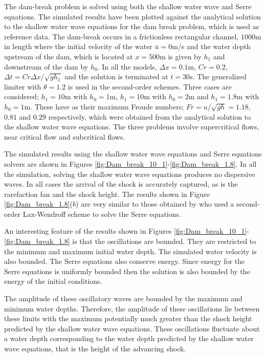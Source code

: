 \documentclass[SingleSpace,12pt]{Serre_ASCE}
\begin{document}
The dam-break problem is solved using both the shallow water wave and Serre equations. The simulated results have been plotted against the analytical solution to the shallow water wave equations for the dam break problem, which is used as reference data. The dam-break occurs in a frictionless rectangular channel, $1000$m in length where the initial velocity of the water $\bar{u} = 0$m/s and the water depth upstream of the dam, which is located at $x = 500$m is given by $h_1$ and downstream of the dam by $h_0$.  In all the models,  $\Delta x = 0.1$m, $Cr = 0.2$, $\Delta t = Cr \Delta x/\sqrt{gh_1}$ and the solution is terminated at $t = 30$s. The generalized limiter with $\theta = 1.2$ is used in the second-order schemes. Three cases are considered; $h_1 = 10$m with $h_0 = 1$m,  $h_1 = 10$m with $h_0 = 2$m and $h_1 = 1.8$m with $h_0 = 1$m. These have as their maximum Froude numbers; $Fr = u/\sqrt{gh} = 1.18$, $0.81$ and $0.29$ respectively, which were obtained from the analytical solution to the shallow water wave equations. The three problems involve supercritical flows, near critical flow and subcritical flows.

The simulated results using the shallow water wave equations and Serre equations solvers are shown in Figures \ref{fig:Dam_break_10_1}-\ref{fig:Dam_break_1.8}. In all the simulation, solving the shallow water wave equations produces no dispersive waves. In all cases the arrival of the shock is accurately captured, as is the rarefaction fan and the shock height. The results shown in Figure \ref{fig:Dam_break_1.8}($b$) are very similar to those obtained by  who used a second-order Lax-Wendroff scheme to solve the Serre equations.

An interesting feature of the results shown in Figures \ref{fig:Dam_break_10_1}-\ref{fig:Dam_break_1.8} is that the oscillations are bounded. They are restricted to the minimum and maximum initial water depth. The simulated water velocity is also bounded. The Serre equations also conserve energy. Since energy for the Serre equations is uniformly bounded  \cite{Li-Y-2006-1255} then the solution is also bounded by the energy of the initial conditions.

The amplitude of these oscillatory waves are bounded by the maximum and minimum water depths. Therefore, the amplitude of these oscillations lie between these limits with the maximum potentially much greater than the shock height predicted by the shallow water wave equations. These oscillations fluctuate about a water depth corresponding to the water depth predicted by the shallow water wave equations, that is the height of the advancing shock.
\end{document}
